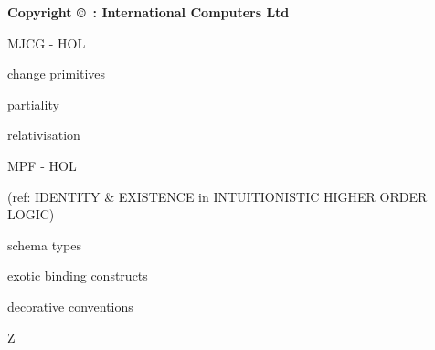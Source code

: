 % 
\def\Hide#1{}
\def\Bool{``$\it{:}bool\,$''}
\makeindex
{}  %
\def\SCCSversion{%
}
\TPPissue{\SCCSversion}  %
\TPPdate{\FormatDate{%
}} %

\TPPclass{}


\TPPsetsizes
\makeTPPfrontpage

\vfill
\begin{centering}

\bf Copyright \copyright\ : International Computers Ltd \number\year

\end{centering}

\newpage
\begin{figure}[h]
\end{figure}

\newpage
\begin{figure}[h]
\end{figure}

\newpage
{\center\huge

\vfill

MJCG - HOL

\vfill

change primitives

\vfill

partiality

\vfill

relativisation

\vfill

MPF - HOL

(ref: IDENTITY \& EXISTENCE in INTUITIONISTIC HIGHER ORDER LOGIC)

\vfill

schema types

\vfill

exotic binding constructs

\vfill

decorative conventions

\vfill

Z

\vfill

}


